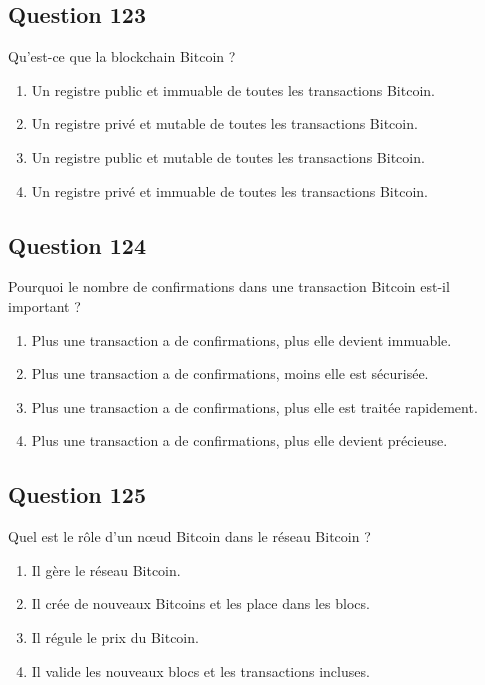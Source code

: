 \documentclass[12pt,a4paper]{article}
\begin{document}
\subsection*{Question 123}
Qu'est-ce que la blockchain Bitcoin ?

\begin{enumerate}[label=\Alph*., leftmargin=*]
\item Un registre public et immuable de toutes les transactions Bitcoin.
\item Un registre privé et mutable de toutes les transactions Bitcoin.
\item Un registre public et mutable de toutes les transactions Bitcoin.
\item Un registre privé et immuable de toutes les transactions Bitcoin.
\end{enumerate}

\bigskip


\subsection*{Question 124}
Pourquoi le nombre de confirmations dans une transaction Bitcoin est-il important ?

\begin{enumerate}[label=\Alph*., leftmargin=*]
\item Plus une transaction a de confirmations, plus elle devient immuable.
\item Plus une transaction a de confirmations, moins elle est sécurisée.
\item Plus une transaction a de confirmations, plus elle est traitée rapidement.
\item Plus une transaction a de confirmations, plus elle devient précieuse.
\end{enumerate}

\bigskip


\subsection*{Question 125}
Quel est le rôle d'un nœud Bitcoin dans le réseau Bitcoin ?

\begin{enumerate}[label=\Alph*., leftmargin=*]
\item Il gère le réseau Bitcoin.
\item Il crée de nouveaux Bitcoins et les place dans les blocs.
\item Il régule le prix du Bitcoin.
\item Il valide les nouveaux blocs et les transactions incluses.
\end{enumerate}
\end{document}
